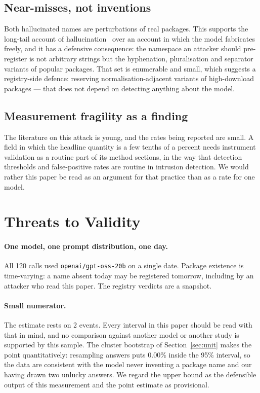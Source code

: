 \documentclass[journal]{IEEEtran}
\providecommand{\citep}[1]{\cite{#1}}
\theoremstyle{definition}
\newcommand{\Nprompts}{120}
\newcommand{\Nhall}{2}
\newcommand{\Model}{openai/\allowbreak{}gpt-\allowbreak{}oss-\allowbreak{}20b}
\newcommand{\UCbLo}{0.00}
\begin{document}
\subsection{Near-misses, not inventions}

Both hallucinated names are perturbations of real packages. This supports the
long-tail account of hallucination~\citep{kandpal2023longtail} over an account
in which the model fabricates freely, and it has a defensive consequence: the
namespace an attacker should pre-register is not arbitrary strings but the
hyphenation, pluralisation and separator variants of popular packages. That set
is enumerable and small, which suggests a registry-side defence: reserving
normalisation-adjacent variants of high-download packages --- that does not
depend on detecting anything about the model.

\subsection{Measurement fragility as a finding}
The literature on this attack is young, and the rates being reported are small.
A field in which the headline quantity is a few tenths of a percent needs
instrument validation as a routine part of its method sections, in the way that
detection thresholds and false-positive rates are routine in intrusion
detection. We would rather this paper be read as an argument for that practice
than as a rate for one model.

\section{Threats to Validity}
\label{sec:threats}

\paragraph{One model, one prompt distribution, one day.} All \Nprompts{} calls
used \texttt{\Model} on a single date. Package existence is time-varying: a name
absent today may be registered tomorrow, including by an attacker who read this
paper. The registry verdicts are a snapshot.

\paragraph{Small numerator.} The estimate rests on \Nhall{} events. Every
interval in this paper should be read with that in mind, and no comparison
against another model or another study is supported by this sample. The
cluster bootstrap of Section~\ref{sec:unit} makes the point quantitatively:
resampling answers puts \UCbLo\% inside the 95\% interval, so the data are
consistent with the model never inventing a package name and our having drawn
two unlucky answers. We regard the upper bound as the defensible output of this
measurement and the point estimate as provisional.
\end{document}
